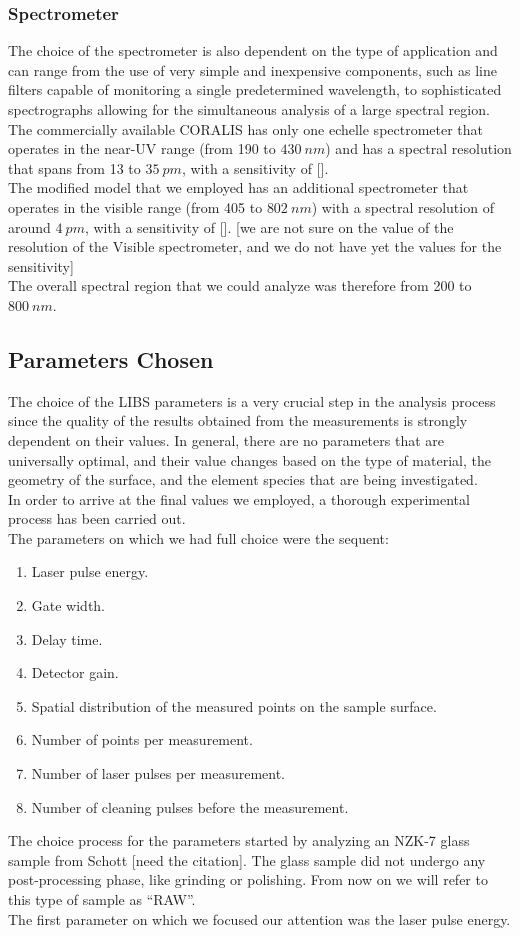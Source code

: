 \subsubsection{Spectrometer}
\label{subsubsec:spectrometer}
The choice of the spectrometer is also dependent on the type of application and can range from the use of very simple and inexpensive components, such as line filters capable of monitoring a single predetermined wavelength, to sophisticated spectrographs allowing for the simultaneous analysis of a large spectral region.
\\
The commercially available CORALIS has only one echelle spectrometer that operates in the near-UV range (from 190 to $430 \: nm$) and has a spectral resolution that spans from 13 to $35 \: pm$, with a sensitivity of [].
\\
The modified model that we employed has an additional spectrometer that operates in the visible range (from 405 to $802\: nm$) with a spectral resolution of around $4 \: pm$, with a sensitivity of [].
[we are not sure on the value of the resolution of the Visible spectrometer, and we do not have yet the values for the sensitivity]
\\
The overall spectral region that we could analyze was therefore from 200 to $800 \: nm$.

\subsection{Parameters Chosen}
\label{subsec:parameters_chosen}
The choice of the LIBS parameters is a very crucial step in the analysis process since the quality of the results obtained from the measurements is strongly dependent on their values. In general, there are no parameters that are universally optimal, and their value changes based on the type of material, the geometry of the surface, and the element species that are being investigated.
\\
In order to arrive at the final values we employed, a thorough experimental process has been carried out.
\\
The parameters on which we had full choice were the sequent:
\begin{enumerate}
    \item Laser pulse energy.
    \item Gate width.
    \item Delay time.
    \item Detector gain.
    \item Spatial distribution of the measured points on the sample surface.
    \item Number of points per measurement.
    \item Number of laser pulses per measurement.
    \item Number of cleaning pulses before the measurement.
\end{enumerate}
The choice process for the parameters started by analyzing an NZK-7 glass sample from Schott [need the citation]. The glass sample did not undergo any post-processing phase, like grinding or polishing. From now on we will refer to this type of sample as “RAW”.
\\
The first parameter on which we focused our attention was the laser pulse energy. 
